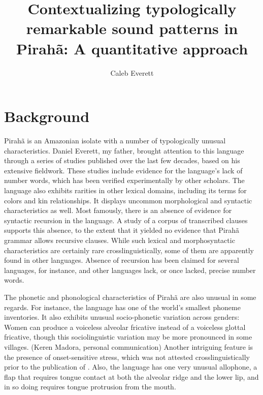 \documentclass[output=paper,colorlinks,citecolor=brown
]{langscibook}
\title{Contextualizing typologically remarkable sound patterns in Pirahã: A quantitative approach}
\author{Caleb Everett}
\date{}
\begin{document}
\maketitle
\abstract

\section{Background}
    Pirahã is an Amazonian isolate with a number of typologically unusual characteristics. Daniel Everett, my father, brought attention to this language through a series of studies published over the last few decades, based on his extensive fieldwork. \cite{everett1982phonetic, everett1984relevance,everett1986piraha,everett2001monolingual} These studies include evidence for the language's lack of number words, which has been verified experimentally by other scholars.\cite{frank2008number, everett2012quantity} The language also exhibits rarities in other lexical domains, including its terms for colors and kin relationships.\cite{everett2005cultural} It displays uncommon morphological and syntactic characteristics as well.\cite{thomason2001pronoun, everett2012language} Most famously, there is an absence of evidence for syntactic recursion in the language.\cite{everett2005cultural} A study of a corpus of transcribed clauses supports this absence, to the extent that it yielded no evidence that Pirahã grammar allows recursive clauses.\cite{futrell2016corpus} While such lexical and morphosyntactic characteristics are certainly rare crosslinguistically, some of them are apparently found in other languages. Absence of recursion has been claimed for several languages, for instance, and other languages lack, or once lacked, precise number words.\cite{pullum2020theorizing, everett2017numbers}
    
    The phonetic and phonological characteristics of Pirahã are also unusual in some regards. For instance, the language has one of the world’s smallest phoneme inventories.\cite{everett2009piraha} It also exhibits unusual socio-phonetic variation across genders: Women can produce a voiceless alveolar fricative instead of a voiceless glottal fricative, though this sociolinguistic variation may be more pronounced in some villages. (Keren Madora, personal communication) Another intriguing feature is the presence of onset-sensitive stress, which was not attested crosslinguistically prior to the publication of \cite{everett1984relevance}. Also, the language has one very unusual allophone, a flap that requires tongue contact at both the alveolar ridge and the lower lip, and in so doing requires tongue protrusion from the mouth.\cite{everett1982phonetic}
\end{document}
